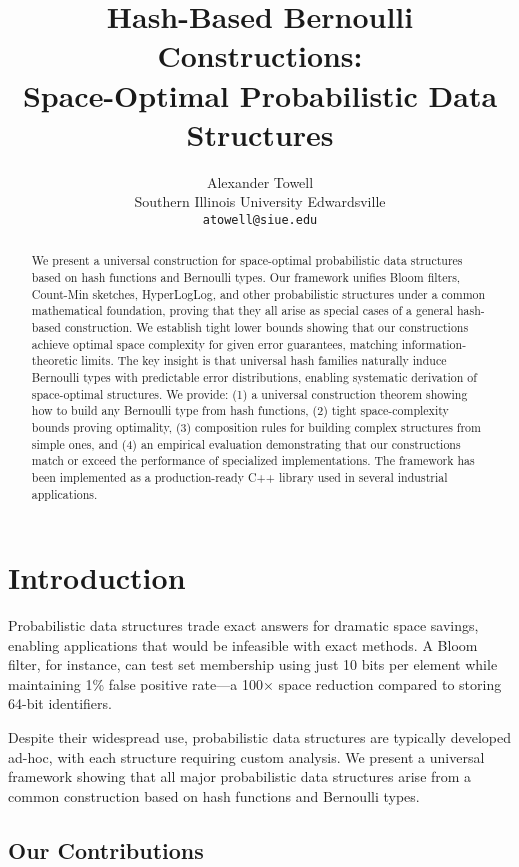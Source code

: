 \documentclass[11pt]{article}
\title{Hash-Based Bernoulli Constructions:\\Space-Optimal Probabilistic Data Structures}
\author{Alexander Towell\\
Southern Illinois University Edwardsville\\
\texttt{atowell@siue.edu}}
\date{}
\begin{document}
\maketitle

\begin{abstract}
We present a universal construction for space-optimal probabilistic data structures based on hash functions and Bernoulli types. Our framework unifies Bloom filters, Count-Min sketches, HyperLogLog, and other probabilistic structures under a common mathematical foundation, proving that they all arise as special cases of a general hash-based construction. We establish tight lower bounds showing that our constructions achieve optimal space complexity for given error guarantees, matching information-theoretic limits. The key insight is that universal hash families naturally induce Bernoulli types with predictable error distributions, enabling systematic derivation of space-optimal structures. We provide: (1) a universal construction theorem showing how to build any Bernoulli type from hash functions, (2) tight space-complexity bounds proving optimality, (3) composition rules for building complex structures from simple ones, and (4) an empirical evaluation demonstrating that our constructions match or exceed the performance of specialized implementations. The framework has been implemented as a production-ready C++ library used in several industrial applications.
\end{abstract}

\section{Introduction}

Probabilistic data structures trade exact answers for dramatic space savings, enabling applications that would be infeasible with exact methods. A Bloom filter, for instance, can test set membership using just 10 bits per element while maintaining 1\% false positive rate—a 100× space reduction compared to storing 64-bit identifiers.

Despite their widespread use, probabilistic data structures are typically developed ad-hoc, with each structure requiring custom analysis. We present a universal framework showing that all major probabilistic data structures arise from a common construction based on hash functions and Bernoulli types.

\subsection{Our Contributions}
\end{document}
